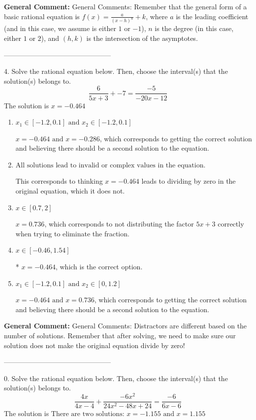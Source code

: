 \documentclass{extbook}[14pt]
\begin{document}
\textbf{General Comment:} General Comments: Remember that the general form of a basic rational equation is $ f(x) = \frac{a}{(x-h)^n} + k$, where $a$ is the leading coefficient (and in this case, we assume is either $1$ or $-1$), $n$ is the degree (in this case, either $1$ or $2$), and $(h, k)$ is the intersection of the asymptotes. 

-----------------------------------------------

4. Solve the rational equation below. Then, choose the interval(s) that the solution(s) belongs to.
\[ \frac{6}{5x + 3} + -7 = \frac{-5}{-20x -12} \] 
The solution is $ x = -0.464 $ 

\begin{enumerate}[label=\Alph*.] 
\item $ x_1 \in [-1.2, 0.1] \text{ and } x_2 \in [-1.2,0.1] $ 

 $x = -0.464 \text{ and } x = -0.286$, which corresponds to getting the correct solution and believing there should be a second solution to the equation. 
\item $ \text{All solutions lead to invalid or complex values in the equation.} $ 

 This corresponds to thinking $x = -0.464$ leads to dividing by zero in the original equation, which it does not. 
\item $ x \in [0.7,2] $ 

 $x = 0.736$, which corresponds to not distributing the factor $5x + 3$ correctly when trying to eliminate the fraction. 
\item $ x \in [-0.46,1.54] $ 

 * $x = -0.464$, which is the correct option. 
\item $ x_1 \in [-1.2, 0.1] \text{ and } x_2 \in [0,1.2] $ 

 $x = -0.464 \text{ and } x = 0.736$, which corresponds to getting the correct solution and believing there should be a second solution to the equation. 
\end{enumerate} 
 
\textbf{General Comment:} General Comments: Distractors are different based on the number of solutions. Remember that after solving, we need to make sure our solution does not make the original equation divide by zero! 

-----------------------------------------------

0. Solve the rational equation below. Then, choose the interval(s) that the solution(s) belongs to.
\[ \frac{4x}{4x -4} + \frac{-6x^{2}}{24x^{2} -48 x + 24} = \frac{-6}{6x -6} \] 
The solution is $ \text{There are two solutions: } x = -1.155 \text{ and } x = 1.155 $ 
\end{document}
